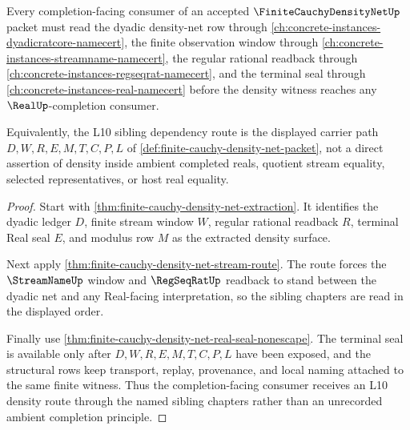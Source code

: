 \begin{theorem}
\label{thm:finite-cauchy-density-net-l10-sibling-density-route}
Every completion-facing consumer of an accepted $\FiniteCauchyDensityNetUp$ packet must read the dyadic density-net row through \autoref{ch:concrete-instances-dyadicratcore-namecert}, the finite observation window through \autoref{ch:concrete-instances-streamname-namecert}, the regular rational readback through \autoref{ch:concrete-instances-regseqrat-namecert}, and the terminal seal through \autoref{ch:concrete-instances-real-namecert} before the density witness reaches any $\RealUp$-completion consumer.

Equivalently, the L10 sibling dependency route is the displayed carrier path $D,W,R,E,M,T,C,P,L$ of \autoref{def:finite-cauchy-density-net-packet}, not a direct assertion of density inside ambient completed reals, quotient stream equality, selected representatives, or host real equality.
\end{theorem}
\begin{proof}
Start with \autoref{thm:finite-cauchy-density-net-extraction}. It identifies the dyadic ledger $D$, finite stream window $W$, regular rational readback $R$, terminal Real seal $E$, and modulus row $M$ as the extracted density surface.

Next apply \autoref{thm:finite-cauchy-density-net-stream-route}. The route forces the $\StreamNameUp$ window and $\RegSeqRatUp$ readback to stand between the dyadic net and any Real-facing interpretation, so the sibling chapters are read in the displayed order.

Finally use \autoref{thm:finite-cauchy-density-net-real-seal-nonescape}. The terminal seal is available only after $D,W,R,E,M,T,C,P,L$ have been exposed, and the structural rows keep transport, replay, provenance, and local naming attached to the same finite witness. Thus the completion-facing consumer receives an L10 density route through the named sibling chapters rather than an unrecorded ambient completion principle.
\end{proof}
